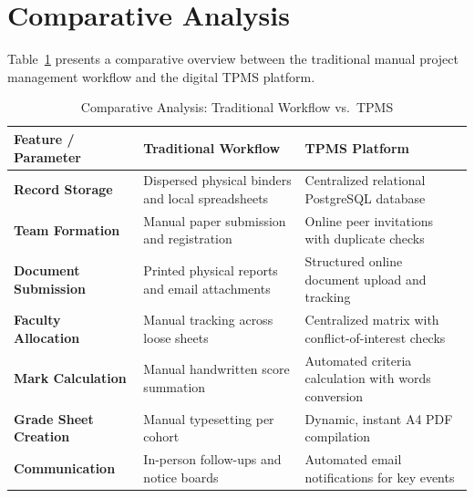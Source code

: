 \section{Comparative Analysis}
Table~\ref{tab:comparison} presents a comparative overview between the traditional manual project management workflow and the digital TPMS platform.

\begin{table}[H]
\centering
\caption{Comparative Analysis: Traditional Workflow vs.\ TPMS}
\label{tab:comparison}
\vspace{4pt}
\small
\begin{tabularx}{\textwidth}{@{}l p{4.8cm} X@{}}
\toprule
\textbf{Feature / Parameter} & \textbf{Traditional Workflow} & \textbf{TPMS Platform} \\
\midrule
\textbf{Record Storage} & Dispersed physical binders and local spreadsheets & Centralized relational PostgreSQL database \\
\addlinespace
\textbf{Team Formation} & Manual paper submission and registration & Online peer invitations with duplicate checks \\
\addlinespace
\textbf{Document Submission} & Printed physical reports and email attachments & Structured online document upload and tracking \\
\addlinespace
\textbf{Faculty Allocation} & Manual tracking across loose sheets & Centralized matrix with conflict-of-interest checks \\
\addlinespace
\textbf{Mark Calculation} & Manual handwritten score summation & Automated criteria calculation with words conversion \\
\addlinespace
\textbf{Grade Sheet Creation} & Manual typesetting per cohort & Dynamic, instant A4 PDF compilation \\
\addlinespace
\textbf{Communication} & In-person follow-ups and notice boards & Automated email notifications for key events \\
\bottomrule
\end{tabularx}
\end{table}
